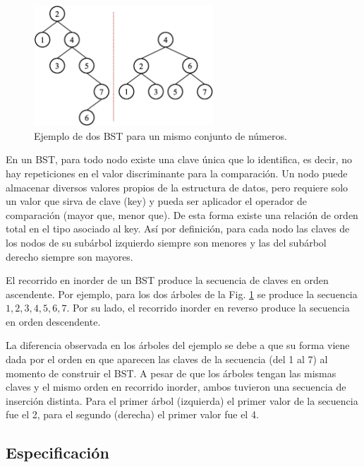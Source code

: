 \begin{figure}[htpb!]
  \begin{center}
    \includegraphics[width=0.6\textwidth]{images/BSTExample1.eps}
  \end{center}
  \caption{Ejemplo de dos BST para un mismo conjunto de números.}
  \label{fig:BSTExample1}
\end{figure}

En un BST, para todo nodo existe una clave única que lo identifica, es decir, no hay repeticiones en el valor discriminante para la comparación. Un nodo puede almacenar diversos valores propios de la estructura de datos, pero requiere solo un valor que sirva de clave (key) y pueda ser aplicador el operador de comparación (mayor que, menor que). De esta forma existe una relación de orden total en el tipo asociado al key. Así por definición, para cada nodo las claves de los nodos de su subárbol izquierdo siempre son menores y las del subárbol derecho siempre son mayores.

El recorrido en inorder de un BST produce la secuencia de claves en orden ascendente. Por ejemplo, para los dos árboles de la Fig. \ref{fig:BSTExample1} se produce la secuencia $1, 2, 3, 4, 5, 6, 7$. Por su lado, el recorrido inorder en reverso produce la secuencia en orden descendente.

La diferencia observada en los árboles del ejemplo se debe a que su forma viene dada por el orden en que aparecen las claves de la secuencia (del 1 al 7) al momento de construir el BST. A pesar de que los árboles tengan las mismas claves y el mismo orden en recorrido inorder, ambos tuvieron una secuencia de inserción distinta. Para el primer árbol (izquierda) el primer valor de la secuencia fue el 2, para el segundo (derecha) el primer valor fue el 4.


\subsection{Especificación}

